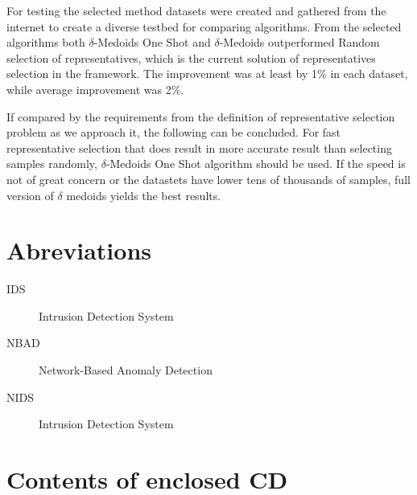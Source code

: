 \documentclass[thesis=B,english]{FITthesis}[2012/10/20]
\begin{document}
For testing the selected method datasets were created and gathered from the internet to create a diverse testbed for comparing algorithms.
From the selected algorithms both $\delta$-Medoids One Shot and $\delta$-Medoids outperformed Random selection of representatives, which is the current solution of representatives selection in the framework.
The improvement was at least by 1\% in each dataset, while average improvement was 2\%. 


If compared by the requirements from the definition of representative selection problem as we approach it, the following can be concluded.
For fast representative selection that does result in more accurate result than selecting samples randomly, $\delta$-Medoids One Shot algorithm should be used.
If the speed is not of great concern or the datastets have lower tens of thousands of samples, full version of $\delta$ medoids yields the best results.




\appendix

\chapter{Abreviations}
\begin{description}
    \item[IDS]  Intrusion Detection System
	\item[NBAD] Network-Based Anomaly Detection
	\item[NIDS] Intrusion Detection System
\end{description}


\chapter{Contents of enclosed CD}


\begin{figure}
\end{figure}
\end{document}
